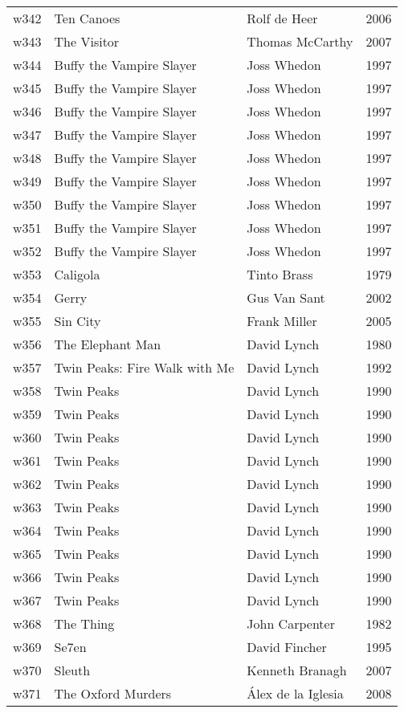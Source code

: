 \documentclass{article}
\begin{document}
\begin {center}
\begin{longtable}{l p{10cm} l l}
w342 & Ten Canoes & Rolf de Heer & 2006 \\
w343 & The Visitor & Thomas McCarthy & 2007 \\
w344 & Buffy the Vampire Slayer & Joss Whedon & 1997 \\
w345 & Buffy the Vampire Slayer & Joss Whedon & 1997 \\
w346 & Buffy the Vampire Slayer & Joss Whedon & 1997 \\
w347 & Buffy the Vampire Slayer & Joss Whedon & 1997 \\
w348 & Buffy the Vampire Slayer & Joss Whedon & 1997 \\
w349 & Buffy the Vampire Slayer & Joss Whedon & 1997 \\
w350 & Buffy the Vampire Slayer & Joss Whedon & 1997 \\
w351 & Buffy the Vampire Slayer & Joss Whedon & 1997 \\
w352 & Buffy the Vampire Slayer & Joss Whedon & 1997 \\
w353 & Caligola & Tinto Brass & 1979 \\
w354 & Gerry & Gus Van Sant & 2002 \\
w355 & Sin City & Frank Miller & 2005 \\
w356 & The Elephant Man & David Lynch & 1980 \\
w357 & Twin Peaks: Fire Walk with Me & David Lynch & 1992 \\
w358 & Twin Peaks & David Lynch & 1990 \\
w359 & Twin Peaks & David Lynch & 1990 \\
w360 & Twin Peaks & David Lynch & 1990 \\
w361 & Twin Peaks & David Lynch & 1990 \\
w362 & Twin Peaks & David Lynch & 1990 \\
w363 & Twin Peaks & David Lynch & 1990 \\
w364 & Twin Peaks & David Lynch & 1990 \\
w365 & Twin Peaks & David Lynch & 1990 \\
w366 & Twin Peaks & David Lynch & 1990 \\
w367 & Twin Peaks & David Lynch & 1990 \\
w368 & The Thing & John Carpenter & 1982 \\
w369 & Se7en & David Fincher & 1995 \\
w370 & Sleuth & Kenneth Branagh & 2007 \\
w371 & The Oxford Murders & Álex de la Iglesia & 2008 \\

\end{longtable}
\end{center}
\end{document}
